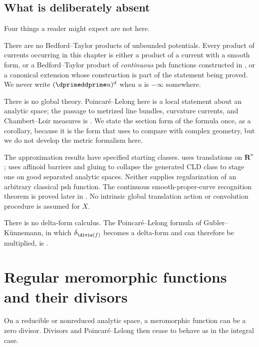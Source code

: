\subsection*{What is deliberately absent}

Four things a reader might expect are not here.

There are no Bedford--Taylor products of unbounded potentials.  Every product
of currents occurring in this chapter is either a product of a current with a
smooth form, or a Bedford--Taylor product of \emph{continuous} psh functions
constructed in , or a canonical extension whose
construction is part of the statement being proved.  We never write
$(\dprimeddprime u)^d$ when $u$ is $-\infty$ somewhere.

There is no global theory.  Poincar\'e--Lelong here is a local statement
about an analytic space; the passage to metrized line bundles, curvature
currents, and Chambert--Loir measures is .
We state the section form of the formula once, as a corollary, because it is
the form that  uses to compare with complex
geometry, but we do not develop the metric formalism here.

The approximation results have specified starting classes.
 uses translations on $\mathbf R^n$;
 uses affinoid barriers and gluing to collapse the
generated CLD class to stage one on good separated analytic spaces. Neither
supplies regularization of an arbitrary classical psh function. The
continuous smooth-proper-curve recognition theorem is proved later in
. No intrinsic global
translation action or convolution procedure is assumed for $X$.

There is no delta-form calculus.  The Poincar\'e--Lelong formula of
Gubler--K\"unnemann, in which $\delta_{\divis(f)}$ becomes a delta-form and
can therefore be multiplied, is .

\section{Regular meromorphic functions and their divisors}
\label{sec:ch15-meromorphic}

On a reducible or nonreduced analytic space, a meromorphic function can be a
zero divisor.  Divisors and Poincar\'e--Lelong then cease to behave as in the
integral case.

